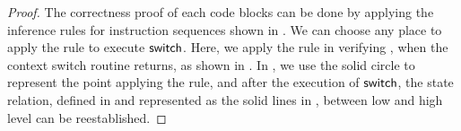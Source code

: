 \begin{proof}
    The correctness proof of each code blocks
    can be done by applying the inference rules for
    instruction sequences shown in
    \Fig{\ref{fig:Selected Inference Rules for Refinement Verification}}.
    We can choose any place to apply the 
     rule to execute $\mathsf{switch}$.
    Here, we apply the  rule
    in verifying
    \SwitchNewTask{},
    when the context switch routine returns,
    as shown in \Fig{\ref{fig:refinement reasoning}}.
    In \Fig{\ref{fig:refinement reasoning}}, we use the
    solid circle to represent the point applying the  rule,
    and after the execution of $\mathsf{switch}$, the
    state relation, defined in \Subsec{\ref{subsec:correctness-primitive}} 
    and represented as the solid lines in \Fig{\ref{fig:refinement reasoning}},
    between low and high level can
    be reestablished.
\end{proof}

